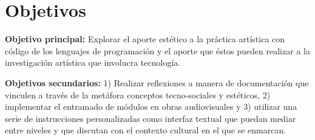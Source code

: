 \section*{Objetivos}

\textbf{Objetivo principal:} Explorar el aporte estético a la práctica artística con código de los lenguajes de programación y el aporte que éstos pueden realizar a la investigación artística que involucra tecnología.

\textbf{Objetivos secundarios:} 1) Realizar reflexiones a manera de documentación que vinculen a través de la metáfora conceptos tecno-sociales y estéticos, 2) implementar el entramado de módulos en obras audiovisuales y 3) utilizar una serie de instrucciones personalizadas como interfaz textual que puedan mediar entre niveles y que discutan con el contexto cultural en el que se enmarcan.





